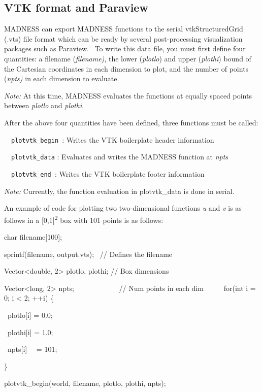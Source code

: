 \documentclass[letterpaper]{article}
\begin{document}
\subsection{VTK format and Paraview}
MADNESS can export MADNESS functions to the serial vtkStructuredGrid (.vts) file format which can be ready by several
post-processing visualization packages such as Paraview. \ To write this data file, you must first define four
quantities: a filename (\textit{filename)}, the lower (\textit{plotlo}) and upper (\textit{plothi}) bound of the
Cartesian coordinates in each dimension to plot, and the number of points (\textit{npts)} in each dimension to
evaluate.

\textit{Note:}\textbf{ }At this time, MADNESS evaluates the functions at equally spaced points between \textit{plotlo
}and \textit{plothi}. \ 

After the above four quantities have been defined, three functions must be called:

\ \ \texttt{plotvtk\_begin }: Writes the VTK boilerplate header information

\ \ \texttt{plotvtk\_data} : Evaluates and writes the MADNESS function at \textit{npts}

\ \ \texttt{plotvtk\_end }: Writes the VTK boilerplate footer information


\bigskip

\textit{Note:}\textbf{ }Currently, the function evaluation in plotvtk\_data is done in serial. \ 

An example of code for plotting two two-dimensional functions \textit{u} and \textit{v} is as follows in a
[0,1]\textsuperscript{2} box with 101 points is as follows:

{\ttfamily
char filename[100];}

{\ttfamily
sprintf(filename, {\textquotedbl}output.vts{\textquotedbl}); \ // Defines the filename}

{\ttfamily
Vector{\textless}double, 2{\textgreater} plotlo, plothi; // Box dimensions}

{\ttfamily
Vector{\textless}long, 2{\textgreater} npts; \ \ \ \ \ \ \ \ \ \ \ \ // Num points in each dim \ \ \ \ \ for(int i = 0;
i {\textless} 2; ++i) \{}

{\ttfamily
\ plotlo[i] = 0.0;}

{\ttfamily
\ plothi[i] = 1.0;}

{\ttfamily
\ npts[i] \ \ = 101;}

{\ttfamily
\}}

{\ttfamily
plotvtk\_begin(world, filename, plotlo, plothi, npts);}
\end{document}
